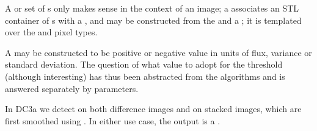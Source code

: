 A  or set of s only makes sense in the 
context of an image; a  associates an STL container of 
s with a , and may be constructed from 
the  and a ; it is templated over the 
 and  pixel types.

A  may be constructed to be positive or negative value in 
units of flux, variance or standard deviation. The question of what value to 
adopt for the threshold (although interesting) has thus been abstracted from 
the algorithms and is answered separately by  parameters. 

In DC3a we detect on both difference images and on stacked images, which are 
first smoothed using . In either use case, the output
is a .

